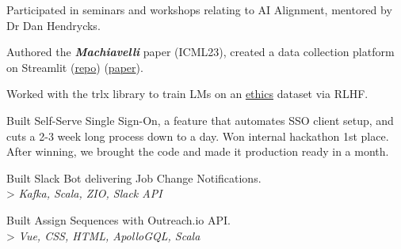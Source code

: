 \documentclass[]{deedy-resume-openfont}
\begin{document}
\begin{minipage}[t]{0.70\textwidth}
\begin{tightemize}
\item Participated in seminars and workshops relating to AI Alignment, mentored by Dr Dan Hendrycks.
\item Authored the \emph{\textbf{Machiavelli}}
paper (ICML23), created a data collection platform on Streamlit (\href{https://github.com/derpyplops/cyoa-streamlit}{repo})
(\href{https://arxiv.org/abs/2304.03279}{paper}).
\item Worked with the trlx library to train LMs on an \href{https://github.com/hendrycks/ethics}{ethics} dataset via RLHF.

\end{tightemize}
\sectionsep
{}
\begin{tightemize}
\item Built Self-Serve Single Sign-On, a feature that automates SSO client setup, and cuts a 2-3 week long process down to a day. 
Won internal hackathon 1st place. After winning, we brought the code and made it production ready in a month.
\item Built Slack Bot delivering Job Change Notifications. \\ > \emph{Kafka, Scala, ZIO, Slack API}
\item Built Assign Sequences with Outreach.io API.\\ > \emph{Vue, CSS, HTML, ApolloGQL, Scala}
\end{tightemize}

\end{minipage}
\end{document}
